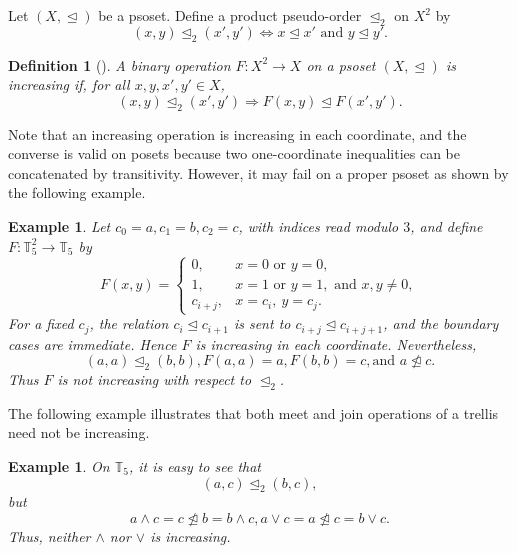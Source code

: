 \documentclass[preprint,12pt]{elsarticle}
\newtheorem{definition}[theorem]{Definition}
\newtheorem{example}[theorem]{Example}
\begin{document}
Let $(X,\trianglelefteq)$ be a psoset. Define a product pseudo-order $\trianglelefteq_2$ on $X^2$ by
$$(x,y)\trianglelefteq_2(x',y')\Longleftrightarrow x\trianglelefteq x'\mbox{ and }y\trianglelefteq y'.
$$

\begin{definition}[\cite{Zedam2023}]
A binary operation $F:X^2\to X$ on a psoset $(X,\trianglelefteq)$ is \emph{increasing} if, for all $x,y,x',y'\in X$,
$$
 (x,y)\trianglelefteq_2(x',y')\Longrightarrow F(x,y)\trianglelefteq F(x',y').
$$
\end{definition}

Note that an increasing operation is increasing in each coordinate, and the converse is valid on posets because two one-coordinate inequalities can be concatenated by transitivity. However, it may fail on a proper psoset as shown by the following example.

\begin{example}
\emph{Let $c_0=a,c_1=b,c_2=c$, with indices read modulo $3$, and define $F:\mathbb{T}_5^2\to\mathbb{T}_5$ by
$$
F(x,y)=
\begin{cases}
0, & x=0\mbox{ or }y=0,\\
1, & x=1\mbox{ or }y=1,\mbox{ and }x,y\neq0,\\
c_{i+j}, & x=c_i,\ y=c_j.
\end{cases}
$$
For a fixed $c_j$, the relation $c_i\trianglelefteq c_{i+1}$ is sent to
$c_{i+j}\trianglelefteq c_{i+j+1}$, and the boundary cases are immediate. Hence $F$ is increasing in each coordinate. Nevertheless,
$$(a,a)\trianglelefteq_2(b,b), F(a,a)=a, F(b,b)=c, \mbox{and }a\ntrianglelefteq c.
$$
Thus $F$ is not increasing with respect to $\trianglelefteq_2$.}
\end{example}

The following example illustrates that both meet and join operations of a trellis need not be increasing.
\begin{example}\label{exam2.7}
\emph{On $\mathbb{T}_5$, it is easy to see that
$$
 (a,c)\trianglelefteq_2(b,c),
$$
but
$$
 a\wedge c=c\ntrianglelefteq b=b\wedge c, a\vee c=a\ntrianglelefteq c=b\vee c.
$$
Thus, neither $\wedge$ nor $\vee$ is increasing.}
\end{example}
\end{document}
